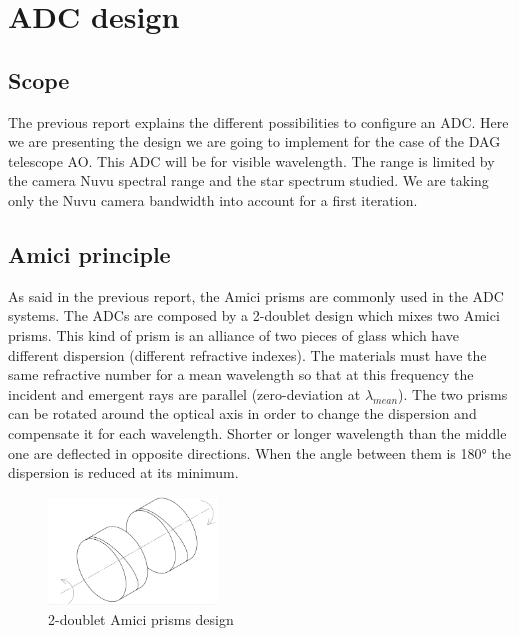\newpage
\section{ADC design}\label{app:ADC}
\subsection{Scope}
The previous report explains the different possibilities to configure an ADC. Here we are presenting the design we are going to implement for the case of the DAG telescope AO. This ADC will be for visible wavelength. The range is limited by the camera Nuvu spectral range and the star spectrum studied. We are taking only the Nuvu camera bandwidth into account for a first iteration.\\

\subsection{Amici principle}
As said in the previous report, the Amici prisms are commonly used in the ADC systems. The ADCs are composed by a 2-doublet design which mixes two Amici prisms. This kind of prism is an alliance of two pieces of glass which have different dispersion (different refractive indexes). The materials must have the same refractive number for a mean wavelength so that at this frequency the incident and emergent rays are parallel (zero-deviation at $\lambda_{mean}$). The two prisms can be rotated around the optical axis in order to change the dispersion and compensate it for each wavelength. Shorter or longer wavelength than the middle one are deflected in opposite directions. When the angle between them is 180° the dispersion is reduced at its minimum.

\begin{figure}[H]
\centering
	\includegraphics[width = 0.4\textwidth]{images/amiciISO.png}
	\caption{2-doublet Amici prisms design}
	\centering
\end{figure}



